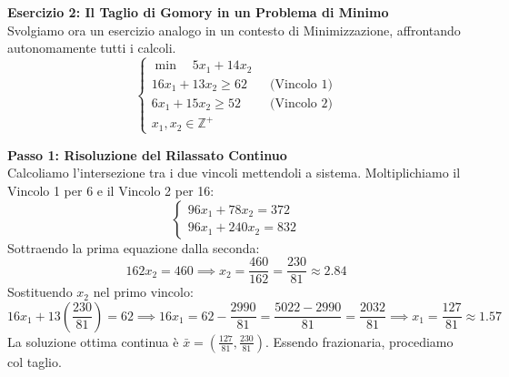 \documentclass[12pt, a4paper]{article}
\begin{document}
	\textbf{Esercizio 2: Il Taglio di Gomory in un Problema di Minimo}\\
	Svolgiamo ora un esercizio analogo in un contesto di Minimizzazione, affrontando autonomamente tutti i calcoli.
	\[
	\begin{cases}
		\min \quad 5x_1 + 14x_2 \\[6pt]
		16x_1 + 13x_2 \geq 62 \quad &\text{(Vincolo 1)} \\
		6x_1 + 15x_2 \geq 52 \quad &\text{(Vincolo 2)} \\[6pt]
		x_1, x_2 \in \mathbb{Z}^+
	\end{cases}
	\]
	
	\textbf{Passo 1: Risoluzione del Rilassato Continuo}\\
	Calcoliamo l'intersezione tra i due vincoli mettendoli a sistema. 
	Moltiplichiamo il Vincolo 1 per 6 e il Vincolo 2 per 16:
	\[
	\begin{cases}
		96x_1 + 78x_2 = 372 \\
		96x_1 + 240x_2 = 832
	\end{cases}
	\]
	Sottraendo la prima equazione dalla seconda: 
	\[
	162x_2 = 460 \implies x_2 = \frac{460}{162} = \frac{230}{81} \approx 2.84
	\]
	Sostituendo $x_2$ nel primo vincolo:
	\[
	16x_1 + 13\left(\frac{230}{81}\right) = 62 \implies 16x_1 = 62 - \frac{2990}{81} = \frac{5022 - 2990}{81} = \frac{2032}{81} \implies x_1 = \frac{127}{81} \approx 1.57
	\]
	La soluzione ottima continua è $\bar{x} = \left(\frac{127}{81}, \frac{230}{81}\right)$. Essendo frazionaria, procediamo col taglio.
	
\end{document}
